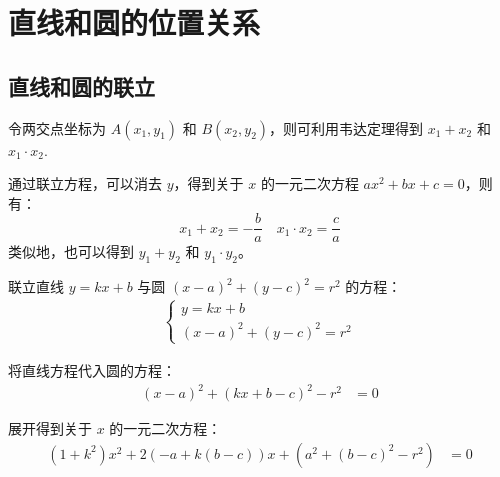 \section{直线和圆的位置关系}

\subsection{直线和圆的联立}

\begin{theorem}
    令两交点坐标为 $A(x_1, y_1)$ 和 $B(x_2, y_2)$，则可利用韦达定理得到 $x_1 + x_2$ 和 $x_1 \cdot x_2$.

    通过联立方程，可以消去 $y$，得到关于 $x$ 的一元二次方程 $ax^2 + bx + c = 0$，则有：
    $$x_1 + x_2 = -\frac{b}{a} \quad x_1 \cdot x_2 = \frac{c}{a}$$
    类似地，也可以得到 $y_1 + y_2$ 和 $y_1 \cdot y_2$。
\end{theorem}

\begin{example}
    联立直线 $y = kx + b$ 与圆 $(x-a)^2 + (y-c)^2 = r^2$ 的方程：
    \begin{align}
        \begin{cases}
            y = kx + b \\
            (x-a)^2 + (y-c)^2 = r^2
        \end{cases}
    \end{align}
\end{example}

\begin{solution}
    将直线方程代入圆的方程：
    \begin{align}
        (x-a)^2 + (kx+b-c)^2 - r^2 & = 0
    \end{align}

    展开得到关于 $x$ 的一元二次方程：
    \begin{align}
        (1+k^2)x^2 + 2(-a+k(b-c))x + (a^2+(b-c)^2-r^2) & = 0
    \end{align}

    \begin{center}
    \end{center}
\end{solution}

